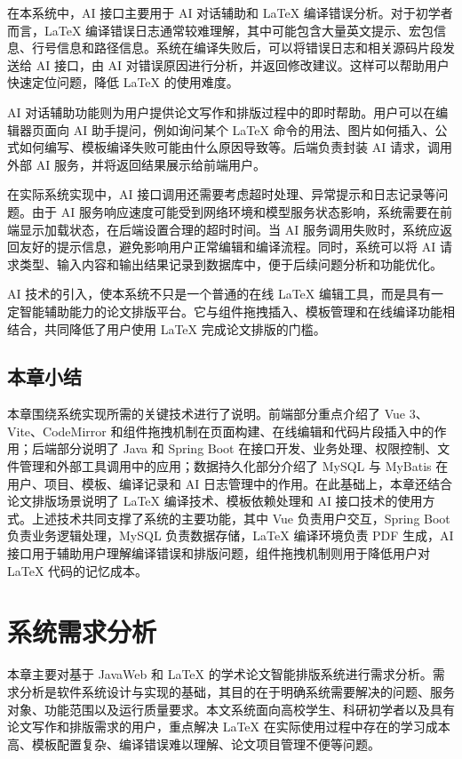 \documentclass{xduugthesis}
\begin{document}
在本系统中，AI 接口主要用于 AI 对话辅助和 LaTeX 编译错误分析。对于初学者而言，LaTeX 编译错误日志通常较难理解，其中可能包含大量英文提示、宏包信息、行号信息和路径信息。系统在编译失败后，可以将错误日志和相关源码片段发送给 AI 接口，由 AI 对错误原因进行分析，并返回修改建议。这样可以帮助用户快速定位问题，降低 LaTeX 的使用难度。

AI 对话辅助功能则为用户提供论文写作和排版过程中的即时帮助。用户可以在编辑器页面向 AI 助手提问，例如询问某个 LaTeX 命令的用法、图片如何插入、公式如何编写、模板编译失败可能由什么原因导致等。后端负责封装 AI 请求，调用外部 AI 服务，并将返回结果展示给前端用户。

在实际系统实现中，AI 接口调用还需要考虑超时处理、异常提示和日志记录等问题。由于 AI 服务响应速度可能受到网络环境和模型服务状态影响，系统需要在前端显示加载状态，在后端设置合理的超时时间。当 AI 服务调用失败时，系统应返回友好的提示信息，避免影响用户正常编辑和编译流程。同时，系统可以将 AI 请求类型、输入内容和输出结果记录到数据库中，便于后续问题分析和功能优化。

AI 技术的引入，使本系统不只是一个普通的在线 LaTeX 编辑工具，而是具有一定智能辅助能力的论文排版平台。它与组件拖拽插入、模板管理和在线编译功能相结合，共同降低了用户使用 LaTeX 完成论文排版的门槛。

\section{本章小结}
本章围绕系统实现所需的关键技术进行了说明。前端部分重点介绍了 Vue 3、Vite、CodeMirror 和组件拖拽机制在页面构建、在线编辑和代码片段插入中的作用；后端部分说明了 Java 和 Spring Boot 在接口开发、业务处理、权限控制、文件管理和外部工具调用中的应用；数据持久化部分介绍了 MySQL 与 MyBatis 在用户、项目、模板、编译记录和 AI 日志管理中的作用。在此基础上，本章还结合论文排版场景说明了 LaTeX 编译技术、模板依赖处理和 AI 接口技术的使用方式。上述技术共同支撑了系统的主要功能，其中 Vue 负责用户交互，Spring Boot 负责业务逻辑处理，MySQL 负责数据存储，LaTeX 编译环境负责 PDF 生成，AI 接口用于辅助用户理解编译错误和排版问题，组件拖拽机制则用于降低用户对 LaTeX 代码的记忆成本。

\chapter{系统需求分析}
本章主要对基于 JavaWeb 和 LaTeX 的学术论文智能排版系统进行需求分析。需求分析是软件系统设计与实现的基础，其目的在于明确系统需要解决的问题、服务对象、功能范围以及运行质量要求\cite{sommerville2015software}。本文系统面向高校学生、科研初学者以及具有论文写作和排版需求的用户，重点解决 LaTeX 在实际使用过程中存在的学习成本高、模板配置复杂、编译错误难以理解、论文项目管理不便等问题。
\end{document}
